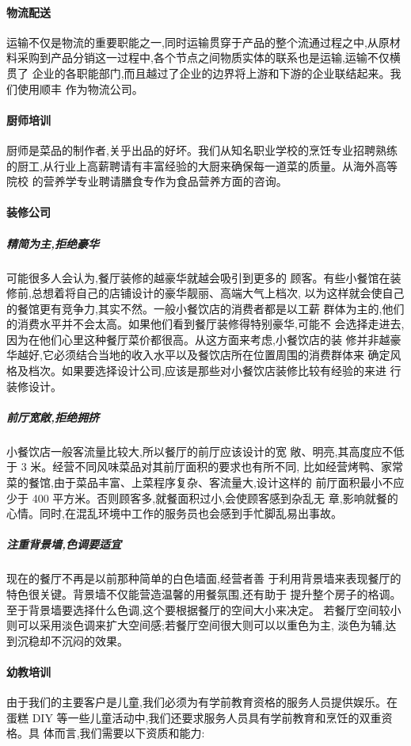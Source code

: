 \paragraph{物流配送}
运输不仅是物流的重要职能之一,同时运输贯穿于产品的整个流通过程之中,从原材
料采购到产品分销这一过程中,各个节点之间物质实体的联系也是运输,运输不仅横贯了
企业的各职能部门,而且越过了企业的边界将上游和下游的企业联结起来。我们使用顺丰
作为物流公司。

\paragraph{厨师培训}
厨师是菜品的制作者,关乎出品的好坏。我们从知名职业学校的烹饪专业招聘熟练
的厨工,从行业上高薪聘请有丰富经验的大厨来确保每一道菜的质量。从海外高等院校
的营养学专业聘请膳食专作为食品营养方面的咨询。

\paragraph{装修公司}
\subparagraph{精简为主,拒绝豪华}
可能很多人会认为,餐厅装修的越豪华就越会吸引到更多的
顾客。有些小餐馆在装修前,总想着将自己的店铺设计的豪华靓丽、高端大气上档次,
以为这样就会使自己的餐馆更有竞争力,其实不然。一般小餐饮店的消费者都是以工薪
群体为主的,他们的消费水平并不会太高。如果他们看到餐厅装修得特别豪华,可能不
会选择走进去,因为在他们心里这种餐厅菜价都很高。从这方面来考虑,小餐饮店的装
修并非越豪华越好,它必须结合当地的收入水平以及餐饮店所在位置周围的消费群体来
确定风格及档次。如果要选择设计公司,应该是那些对小餐饮店装修比较有经验的来进
行装修设计。
\subparagraph{ 前厅宽敞,拒绝拥挤 }
小餐饮店一般客流量比较大,所以餐厅的前厅应该设计的宽
敞、明亮,其高度应不低于 3 米。经营不同风味菜品对其前厅面积的要求也有所不同,
比如经营烤鸭、家常菜的餐馆,由于菜品丰富、上菜程序复杂、客流量大,设计这样的
前厅面积最小不应少于 400 平方米。否则顾客多,就餐面积过小,会使顾客感到杂乱无
章,影响就餐的心情。同时,在混乱环境中工作的服务员也会感到手忙脚乱易出事故。
\subparagraph{ 注重背景墙,色调要适宜 }
现在的餐厅不再是以前那种简单的白色墙面,经营者善
于利用背景墙来表现餐厅的特色很关键。背景墙不仅能营造温馨的用餐氛围,还有助于
提升整个房子的格调。至于背景墙要选择什么色调,这个要根据餐厅的空间大小来决定。
若餐厅空间较小则可以采用淡色调来扩大空间感;若餐厅空间很大则可以以重色为主,
淡色为辅,达到沉稳却不沉闷的效果。

\paragraph{幼教培训}
由于我们的主要客户是儿童,我们必须为有学前教育资格的服务人员提供娱乐。在
蛋糕 DIY 等一些儿童活动中,我们还要求服务人员具有学前教育和烹饪的双重资格。具
体而言,我们需要以下资质和能力:

